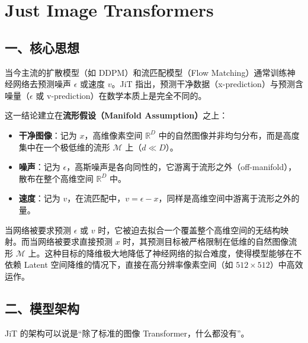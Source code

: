 \setcounter{section}{5}

\hypertarget{just-image-transformers}{%
\section{Just Image Transformers}\label{just-image-transformers}}

\hypertarget{ux4e00ux6838ux5fc3ux601dux60f3-11}{%
\subsection{一、核心思想}\label{ux4e00ux6838ux5fc3ux601dux60f3-11}}

当今主流的扩散模型（如 DDPM）和流匹配模型（Flow Matching）通常训练神经网络去预测噪声 \(\epsilon\) 或速度 \(v\)。JiT 指出，预测干净数据（x-prediction）与预测含噪量（\(\epsilon\) 或 v-prediction）在数学本质上是完全不同的。

这一结论建立在\textbf{流形假设（Manifold Assumption）}之上：

\begin{itemize}
\tightlist
\item
  \textbf{干净图像}：记为 \(x\)，高维像素空间 \(\mathbb{R}^D\) 中的自然图像并非均匀分布，而是高度集中在一个极低维的流形 \(\mathcal{M}\) 上（\(d\ll D\)）。
\item
  \textbf{噪声}：记为 \(\epsilon\)，高斯噪声是各向同性的，它游离于流形之外（off-manifold），散布在整个高维空间 \(\mathbb{R}^D\) 中。
\item
  \textbf{速度}：记为 \(v\)，在流匹配中，\(v=\epsilon-x\)，同样是高维空间中游离于流形之外的量。
\end{itemize}

当网络被要求预测 \(\epsilon\) 或 \(v\) 时，它被迫去拟合一个覆盖整个高维空间的无结构映射。而当网络被要求直接预测 \(x\) 时，其预测目标被严格限制在低维的自然图像流形 \(\mathcal{M}\) 上。这种目标的降维极大地降低了神经网络的拟合难度，使得模型能够在不依赖 Latent 空间降维的情况下，直接在高分辨率像素空间（如 \(512\times512\)）中高效运作。

\hypertarget{ux4e8cux6a21ux578bux67b6ux6784-2}{%
\subsection{二、模型架构}\label{ux4e8cux6a21ux578bux67b6ux6784-2}}

JiT 的架构可以说是``除了标准的图像 Transformer，什么都没有''。

